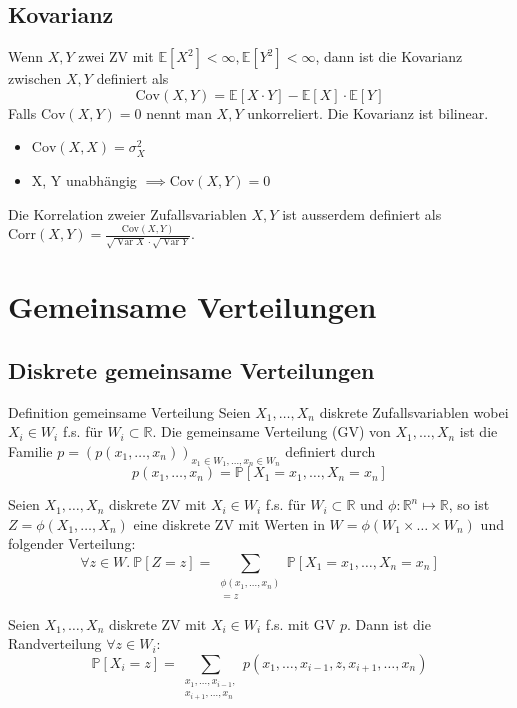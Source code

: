 \documentclass[a4paper,10pt]{article}
\def\R{\mathbb{R}}
\def\P{\mathbb{P}}
\def\E{\mathbb{E}}
\DeclareMathOperator{\Var}{\text{Var}}
\begin{document}
\subsection{Kovarianz}
\begin{subbox}{}
	Wenn \(X, Y\) zwei ZV mit \(\E[X^2] < \infty, \E[Y^2] < \infty\), dann ist die Kovarianz zwischen \(X, Y\) definiert als
	\[\text{Cov}(X,Y) = \E[X \cdot Y] - \E[X] \cdot \E[Y]\]
	Falls $\text{Cov}(X,Y) = 0$ nennt man $X, Y$ unkorreliert. Die Kovarianz ist bilinear.
\end{subbox}
\begin{itemize}
	\item \(\text{Cov}(X,X) = \sigma_X^2\)
	\item X, Y unabhängig \(\implies \text{Cov}(X,Y) = 0\)
\end{itemize}

Die Korrelation zweier Zufallsvariablen $X, Y$ ist ausserdem definiert als $\text{Corr}(X,Y) = \frac{\text{Cov}(X,Y)}{\sqrt{\Var{X}} \cdot \sqrt{\Var{Y}}}$.
\section{Gemeinsame Verteilungen}
\subsection{Diskrete gemeinsame Verteilungen}
\begin{subbox}{Definition gemeinsame Verteilung}
	Seien \(X_1, \ldots, X_n\) diskrete Zufallsvariablen wobei \(X_i \in W_i\) f.s. für \(W_i \subset \R\). Die gemeinsame Verteilung (GV) von \(X_1, \ldots, X_n\) ist die Familie \(p = (p(x_1, \ldots, x_n))_{x_1 \in W_1, \ldots, x_n \in W_n}\) definiert durch
	\[p(x_1, \ldots, x_n) = \P[X_1 = x_1, \ldots, X_n = x_n]\]
\end{subbox}

Seien \(X_1,\ldots,X_n\) diskrete ZV mit \(X_i \in W_i\) f.s. für \(W_i \subset \R\) und \(\phi: \R^n \mapsto \R\), so ist \(Z = \phi(X_1, \ldots, X_n)\) eine diskrete ZV mit Werten in \(W = \phi(W_1 \times \ldots \times W_n)\) und folgender Verteilung:
\[\forall z \in W. \ \P[Z = z] = \sum_{\substack{\phi(x_1, \ldots, x_n) \\= z}} \P[X_1 = x_1, \ldots, X_n = x_n]\]

Seien \(X_1,\ldots,X_n\) diskrete ZV mit \(X_i \in W_i\) f.s. mit GV \(p\). Dann ist die Randverteilung \(\forall z \in W_i\):
\[\P[X_i = z] = \sum_{\substack{x_1, \ldots, x_{i-1}, \\x_{i+1},\ldots,x_n}} p(x_1, \ldots, x_{i-1}, z, x_{i+1},\ldots,x_n)\]
\end{document}

